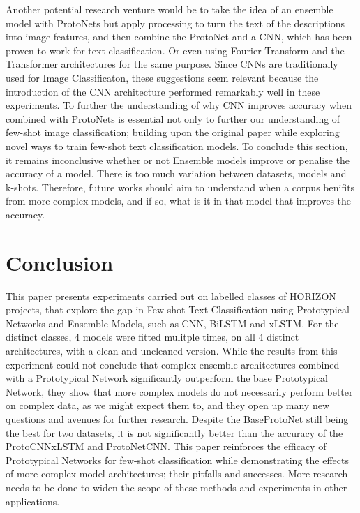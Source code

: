\documentclass[manuscript, anonymous=true, review=true]{acmart}
\begin{document}
Another potential research venture would be to take the idea of an ensemble model with ProtoNets but apply processing to turn the text of the descriptions into image features, and then combine the ProtoNet and a CNN, which has been proven to work for text classification\cite{8270269}. Or even using Fourier Transform and the Transformer architectures for the same purpose\cite{Kachare_Goswami_Gupta_Chouhan_2025}.
Since CNNs are traditionally used for Image Classificaton, these suggestions seem relevant because the introduction of the CNN architecture performed remarkably well in these experiments. To further the understanding of why CNN improves accuracy when combined with ProtoNets is essential not only to further our understanding of
 few-shot image classification; building upon the original paper while exploring novel ways to train few-shot text classification models. 
To conclude this section, it remains inconclusive whether or not Ensemble models improve or penalise the accuracy of a model. There is too much variation between datasets, models and k-shots. Therefore, future works should aim to understand when a corpus benifits from more complex models, and if so, what is it in that model that improves the accuracy. 

\section{Conclusion}

This paper presents experiments carried out on labelled classes of HORIZON projects, that explore the gap in Few-shot Text Classification using Prototypical Networks and Ensemble Models, such as CNN, BiLSTM and xLSTM.
For the distinct classes, 4 models were fitted mulitple times, on all 4 distinct architectures, with a clean and uncleaned version.
While the results from this experiment could not conclude that complex ensemble architectures combined with a Prototypical Network significantly outperform the base Prototypical Network, they show that more complex models do not necessarily perform better on complex data, as we might expect them to, and they open up many new questions and avenues for further research.
Despite the BaseProtoNet still being the best for two datasets, it is not significantly better than the accuracy of the ProtoCNNxLSTM and ProtoNetCNN.
This paper reinforces the efficacy of Prototypical Networks for few-shot classification while demonstrating the effects of more complex model architectures; their pitfalls and successes.
More research needs to be done to widen the scope of these methods and experiments in other applications.
\end{document}

